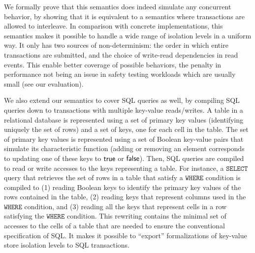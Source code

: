 We formally prove that this semantics does indeed simulate any concurrent behavior, by 
showing that it is equivalent to a semantics where transactions are allowed to interleave.
In comparison with concrete implementations, this semantics makes it possible to handle 
a wide range of isolation levels in a uniform way. It only has two sources of
non-determinism: 
the order in which entire transactions are submitted, and the choice of write-read dependencies in read 
events. This enable better coverage of possible behaviors, the penalty in performance not
being an issue in safety testing workloads which are usually small (see our evaluation). 


We also extend our semantics to cover SQL queries as well, by compiling SQL queries down to transactions with multiple key-value reads/writes. A table in a relational database is represented using a set of primary key values (identifying uniquely the set of rows) and a set of keys, one for each cell in the table. The set of primary key values is represented using a set of Boolean key-value pairs that simulate its characteristic function (adding or removing an element corresponds to updating one of these keys to $\mathsf{true}$ or $\mathsf{false}$). Then, SQL queries are compiled to read or write accesses to the keys representing a table. For instance, a $\mathtt{SELECT}$ query that retrieves the set of rows in a table that satisfy a $\mathtt{WHERE}$ condition is compiled to (1) reading Boolean keys to identify the primary key values of the rows contained in the table, (2) reading keys that represent columns used in the $\mathtt{WHERE}$ condition, and (3) reading all the keys that represent cells in a row satisfying the $\mathtt{WHERE}$ condition. This rewriting contains the minimal set of accesses to the cells of a table that are needed to ensure the conventional specification of SQL.
It makes it possible to ``export'' formalizations of key-value store isolation levels to SQL transactions.

